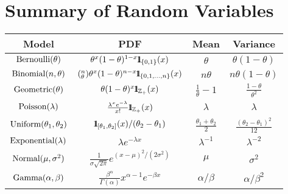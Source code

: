 \section*{Summary of Random Variables}\label{S:SummaryRVs}
\begin{table}[ht]
\centering
\begin{tabular}{|c|c|c|c|}%
\hline
Model &PDF&Mean&Variance\\ \hline%
$\mbox{{\rm Bernoulli}}(\theta)$ &$\theta^x(1-\theta)^{1-x} {1}\mspace{-11 mu}{1}_{\{0,1\}}(x)$&$\theta$&$\theta(1-\theta)$\\%
$\mbox{{\rm Binomial}}(n,\theta)$&$(^n_{\theta})\theta^x(1-\theta)^{n-x} {1}\mspace{-11 mu}{1}_{\{0,1,\ldots,n\}}(x)$&$n \theta$&$n \theta(1-\theta)$\\%
$\mbox{{\rm Geometric}}(\theta)$ &$\theta(1-\theta)^{x} {1}\mspace{-11 mu}{1}_{\mathbb{Z}_+}(x)$&$ \frac{1}{\theta}-1$&$\frac{1-\theta}{\theta^2}$\\%
$\mbox{{\rm Poisson}}(\lambda)$&$\frac{\lambda^xe^{-\lambda}}{x!} {1}\mspace{-11 mu}{1}_{\mathbb{Z}_+}(x)$&$\lambda$&$\lambda$\\%
$\mbox{{\rm Uniform}}(\theta_1,\theta_2)$&${1}\mspace{-11 mu}{1}_{[\theta_1,\theta_2]}(x)/(\theta_2-\theta_1)$&$\frac{\theta_1+\theta_2}{2}$&$\frac{(\theta_2-\theta_1)^2}{12}$\\%
$\mbox{{\rm Exponential}}(\lambda)$&$\lambda e^{-\lambda x}$&$\lambda^{-1}$&$\lambda^{-2}$\\%
$\mbox{{\rm Normal}}(\mu,\sigma^2)$&$\frac{1}{\sigma\sqrt{2\pi}}e^{(x-\mu)^2/(2\sigma^2)}$&$\mu$&$\sigma^2$\\%
$\mbox{{\rm Gamma}}(\alpha,\beta)$&$\frac{\beta^{\alpha}}{\Gamma(\alpha)}{x^{\alpha-1}e^{-\beta x}}$&$\alpha/\beta$&$\alpha/\beta^2$\\%

\end{tabular}
\end{table}
